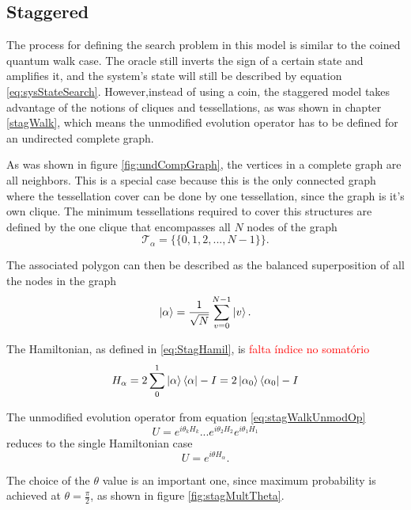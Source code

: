 \documentclass[../../dissertation.tex]{subfiles}
\begin{document}
\subsection{Staggered}
The process for defining the search problem in this model is similar to the coined quantum walk case. The oracle still inverts the sign of a certain state and amplifies it, and the system's state will still be described by equation \ref{eq:sysStateSearch}. However,instead of using a coin, the staggered model takes advantage of the notions of cliques and tessellations, as was shown in chapter \ref{stagWalk}, which means the unmodified evolution operator has to be defined for an undirected complete graph.\par
As was shown in figure \ref{fig:undCompGraph}, the vertices in a complete graph are all neighbors. This is a special case because this is the only connected graph where the tessellation cover can be done by one tessellation, since the graph is it's own clique. The minimum tessellations required to cover this structures are defined by the one clique that encompasses all $N$ nodes of the graph
\begin{equation}
	\mathscr{T}_{\alpha} = \{\{0,1,2,...,N-1\}\}.
\end{equation}\par
The associated polygon can then be described as the balanced superposition of all the nodes in the graph
\begin{equation}
	\ket{\alpha} = \frac{1}{\sqrt{N}} \sum_{v=0}^{N-1} \ket{v}.
\end{equation}\par
The Hamiltonian, as defined in \ref{eq:StagHamil}, is \textcolor{red}{falta índice no somatório}
\begin{equation}
	H_\alpha = 2\sum_0^1\ket{\alpha}\bra{\alpha} - I = 2\ket{\alpha_0}\bra{\alpha_0} - I
\end{equation}\par
The unmodified evolution operator from equation \ref{eq:stagWalkUnmodOp}
\begin{equation}
	U = e^{i\theta_{k}H_{k}}...e^{i\theta_{2}H_{2}}e^{i\theta_{1}H_{1}}
\end{equation}
reduces to the single Hamiltonian case
\begin{equation}
	U = e^{i\theta H_\alpha}.
	\label{eq:stagQWSearchUnmodEvo1}
\end{equation}\par
The choice of the $\theta$ value is an important one, since maximum probability is achieved at $\theta = \frac{\pi}{2}$, as shown in figure \ref{fig:stagMultTheta}.
\end{document}
